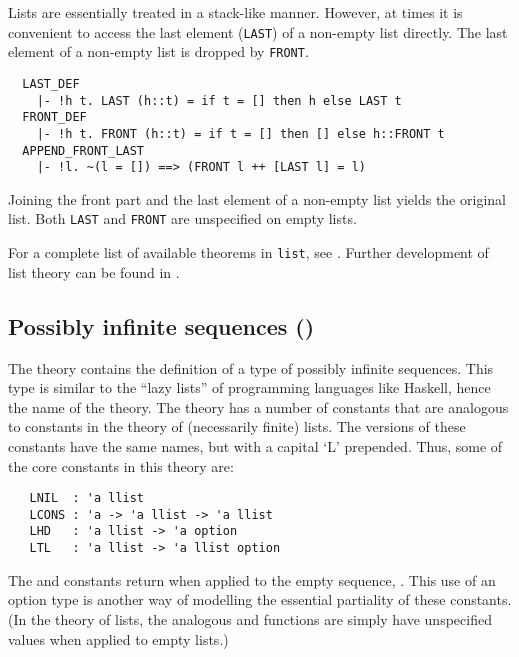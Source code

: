 Lists are essentially treated in a stack-like manner. However, at
times it is convenient to access the last element
({\small\verb+LAST+}) of a non-empty list directly. The last element
of a non-empty list is dropped by {\small\verb+FRONT+}.
%
{\small
\begin{verbatim}
  LAST_DEF
    |- !h t. LAST (h::t) = if t = [] then h else LAST t
  FRONT_DEF
    |- !h t. FRONT (h::t) = if t = [] then [] else h::FRONT t
  APPEND_FRONT_LAST
    |- !l. ~(l = []) ==> (FRONT l ++ [LAST l] = l)
\end{verbatim}
}
%
Joining the front part and the last element of a non-empty list yields
the original list.  Both {\small\verb+LAST+} and {\small\verb+FRONT+}
are unspecified on empty lists.

\noindent For a complete list of available theorems in
{\small\verb+list+}, see \REFERENCE.  Further development of list
theory can be found in .


\subsection{Possibly infinite sequences ()}

The theory  contains the definition of a type of
possibly infinite sequences.  This type is similar to the ``lazy
lists'' of programming languages like Haskell, hence the name of the
theory.  The  theory has a number of constants that
are analogous to constants in the theory of (necessarily finite)
lists.  The  versions of these constants have the
same names, but with a capital `L\/' prepended.  Thus, some of the core
constants in this theory are:

{\small
\begin{verbatim}
   LNIL  : 'a llist
   LCONS : 'a -> 'a llist -> 'a llist
   LHD   : 'a llist -> 'a option
   LTL   : 'a llist -> 'a llist option
\end{verbatim}
}

The  and  constants return  when applied to
the empty sequence, .  This use of an option type is another
way of modelling the essential partiality of these constants.  (In the
theory of lists, the analogous  and  functions are
simply have unspecified values when applied to empty lists.)

